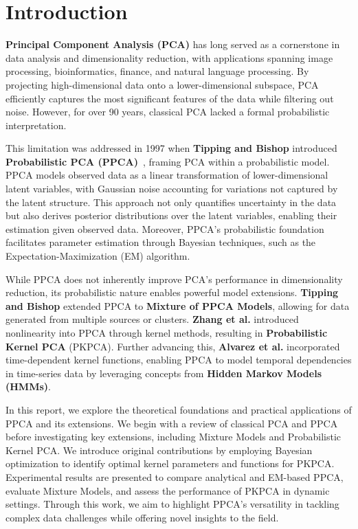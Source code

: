 \documentclass{article}
\begin{document}
\section{Introduction}



\textbf{Principal Component Analysis (PCA)} has long served as a cornerstone in data analysis and dimensionality reduction, with applications spanning image processing, bioinformatics, finance, and natural language processing. By projecting high-dimensional data onto a lower-dimensional subspace, PCA efficiently captures the most significant features of the data while filtering out noise. However, for over 90 years, classical PCA lacked a formal probabilistic interpretation.

This limitation was addressed in 1997 when \textbf{Tipping and Bishop} introduced \textbf{Probabilistic PCA (PPCA)}~\cite{}, framing PCA within a probabilistic model. PPCA models observed data as a linear transformation of lower-dimensional latent variables, with Gaussian noise accounting for variations not captured by the latent structure. This approach not only quantifies uncertainty in the data but also derives posterior distributions over the latent variables, enabling their estimation given observed data. Moreover, PPCA's probabilistic foundation facilitates parameter estimation through Bayesian techniques, such as the Expectation-Maximization (EM) algorithm.

While PPCA does not inherently improve PCA’s performance in dimensionality reduction, its probabilistic nature enables powerful model extensions. \textbf{Tipping and Bishop} extended PPCA to \textbf{Mixture of PPCA Models}, allowing for data generated from multiple sources or clusters. \textbf{Zhang et al.} introduced nonlinearity into PPCA through kernel methods, resulting in \textbf{Probabilistic Kernel PCA} (PKPCA). Further advancing this, \textbf{Alvarez et al.} incorporated time-dependent kernel functions, enabling PPCA to model temporal dependencies in time-series data by leveraging concepts from \textbf{Hidden Markov Models (HMMs)}.

In this report, we explore the theoretical foundations and practical applications of PPCA and its extensions. We begin with a review of classical PCA and PPCA before investigating key extensions, including Mixture Models and Probabilistic Kernel PCA. We introduce original contributions by employing Bayesian optimization to identify optimal kernel parameters and functions for PKPCA. Experimental results are presented to compare analytical and EM-based PPCA, evaluate Mixture Models, and assess the performance of PKPCA in dynamic settings. Through this work, we aim to highlight PPCA’s versatility in tackling complex data challenges while offering novel insights to the field.
\end{document}
